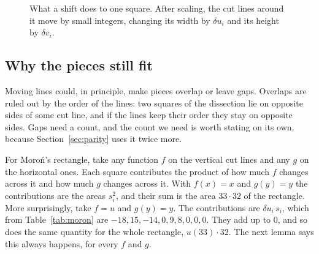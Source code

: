 \documentclass[11pt]{amsart}
\theoremstyle{definition}
\begin{document}
\begin{figure}[ht]
\centering
{}
\caption{What a shift does to one square. After scaling, the cut lines around it move by small
integers, changing its width by $\delta u_i$ and its height by $\delta v_i$.}
\label{fig:shift}
\end{figure}

\subsection*{Why the pieces still fit} Moving lines could, in principle, make pieces overlap or leave
gaps. Overlaps are ruled out by the order of the lines: two squares of the dissection lie on opposite sides of some
cut line, and if the lines keep their order they stay on opposite sides. Gaps need a count, and
the count we need is worth stating on its own, because Section~\ref{sec:parity} uses it twice more.

For Moro\'n's rectangle, take any function $f$ on the vertical cut lines and any $g$ on the
horizontal ones. Each square contributes the product of how much $f$ changes across it and how much
$g$ changes across it. With $f(x)=x$ and $g(y)=y$ the contributions are the areas $s_i^2$, and their
sum is the area $33\cdot32$ of the rectangle. More surprisingly, take $f=u$ and $g(y)=y$. The contributions
are $\delta u_i\,s_i$, which from Table~\ref{tab:moron} are $-18,15,-14,0,9,8,0,0,0$. They add up to
$0$, and so does the same quantity for the whole rectangle, $u(33)\cdot32$. The next lemma says this
always happens, for every $f$ and $g$.
\end{document}
